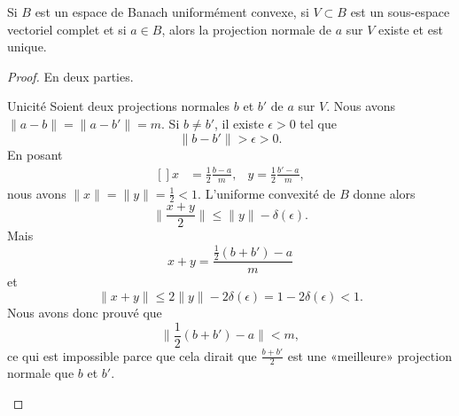 \begin{theorem}     \label{THOooOOVVooMhzHqd}
    Si \( B\) est un espace de Banach uniformément convexe, si \( V\subset B\) est un sous-espace vectoriel complet et si \( a\in B\), alors la projection normale de \( a\) sur \( V\) existe et est unique.
\end{theorem}

\begin{proof}
    En deux parties.
    \begin{subproof}
        \item[Unicité]
            Soient deux projections normales \( b\) et \( b'\) de \( a\) sur \( V\). Nous avons \( \| a-b \|=\| a-b' \|=m\). Si \( b\neq b'\), il existe \( \epsilon>0\) tel que
            \begin{equation}
                \| b-b' \|>\epsilon>0.
            \end{equation}
            En posant
            \begin{equation}
                \begin{aligned}[]
                    x&=\frac{ 1 }{2}\frac{ b-a }{ m },&y=\frac{ 1 }{2}\frac{ b'-a }{ m },
                \end{aligned}
            \end{equation}
            nous avons \( \| x \|=\| y \|=\frac{ 1 }{2}<1\). L'uniforme convexité de \( B\) donne alors
            \begin{equation}
                \| \frac{ x+y }{2} \|\leq \| y \|-\delta(\epsilon).
            \end{equation}
            Mais
            \begin{equation}
                x+y=\frac{ \frac{ 1 }{2}(b+b')-a }{ m }
            \end{equation}
            et
            \begin{equation}
                \| x+y \|\leq 2\| y \|-2\delta(\epsilon)=1-2\delta(\epsilon)<1.
            \end{equation}
            Nous avons donc prouvé que
            \begin{equation}
                \| \frac{ 1 }{2}(b+b')-a \|<m,
            \end{equation}
            ce qui est impossible parce que cela dirait que \( \frac{ b+b' }{2}\) est une «meilleure» projection normale que \( b\) et \( b'\).


\end{subproof}
\end{proof}

